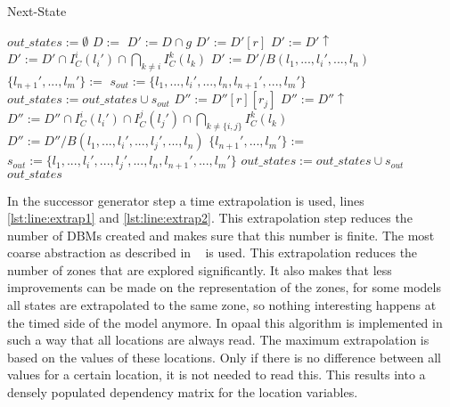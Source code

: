 \begin{algorithm}
\caption{Next-State}\label{alg:successor-gen}
\begin{algorithmic}[1]
	\State $out\_states := \emptyset$	
	\State $D := $		
	\State {}
	 \label{lst:line:alllocs}
		 \label{lst:line:alltrans}
			\State $D' := D \cap g$
			\label{lst:line:empty1}
				 \label{lst:line:normaltrans}
					\State $D' := D'[r]$
					\State $D' := D'\uparrow$
					\State $D' := D' \cap I_C^i(l_i') \cap \bigcap_{k \neq i} I_C^k(l_k)$
					\label{lst:line:empty2}
						\State $D' := D'/ B(l_1,...,l_i',...,l_n)$\label{lst:line:extrap1}
						\State \Call{ReduceZero}{$D'$}
						\State $\{l_{n+1}',...,l_m'\} := $
						\State $s_{out} := \{l_1,...,l_i',...,l_n,l_{n+1}',...,l_m'\}$
						\State $out\_states := out\_states \cup s_{out}$
					\EndIf \label{lst:line:endnormaltrans}
				\Else
					 \label{lst:line:synctrans}
						\label{lst:line:alllocs2}
								\label{lst:line:empty3}
									\State $D'' := D''[r][r_j]$
									\State $D'' := D''\uparrow$
									\State $D'' := D'' \cap I_C^i(l_i') \cap I_C^j(l_j') \cap \bigcap_{k \neq \{i,j\}} I_C^k(l_k)$
									\label{lst:line:empty4}
										\State $D''	:= D''/ B(l_1,...,l_i',...,l_j',...,l_n)$\label{lst:line:extrap2}						
										\State {}		
										\State $\{l_{n+1}',...,l_m'\} := $
										\State $s_{out} := \{l_1,...,l_i',...,l_j',...,l_n,l_{n+1}',...,l_m'\}$
										\State $out\_states := out\_states \cup s_{out}$
									\EndIf								
								\EndIf							
							\EndFor
						\EndFor \label{lst:line:endsynctrans}
					\EndIf
				\EndIf
			\EndIf
		\EndFor
	\EndFor
	\State \Return $out\_states$
\EndProcedure
\end{algorithmic}
\end{algorithm}
\label{subsec:extrapolation}
In the successor generator step a time extrapolation is used, lines \ref{lst:line:extrap1} and \ref{lst:line:extrap2}. This extrapolation step reduces the number of DBMs created and makes sure that this number is finite. The most coarse abstraction as described in ~\cite{Behrmann2004} is used. This extrapolation reduces the number of zones that are explored significantly. It also makes that less improvements can be made on the representation of the zones, for some models all states are extrapolated to the same zone, so nothing interesting happens at the timed side of the model anymore. In opaal this algorithm is implemented in such a way that all \uppaal{} locations are always read. The maximum extrapolation is based on the values of these locations. Only if there is no difference between all values for a certain location, it is not needed to read this. This results into a densely populated dependency matrix for the location variables. 

